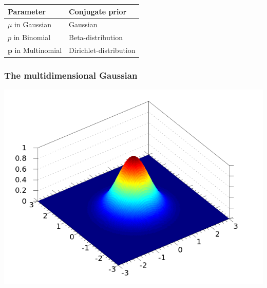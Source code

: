 \documentclass[12pt, a4paper]{article}
\newcommand{\vect}[1]{\bm{#1}}
\begin{document}
\begin{center}
	\begin{tabular}{ll} 
		\toprule 
		Parameter & Conjugate prior \\ \midrule
		$\mu$ in Gaussian & Gaussian \\
		$p$ in Binomial & Beta-distribution \\
		$\vect{p}$ in Multinomial & Dirichlet-distribution \\
		\bottomrule
	\end{tabular}
\end{center}


\subsubsection*{The multidimensional Gaussian}
\begin{center}
	\includegraphics[width=0.6\linewidth]{figs/2d_gaussian}
\end{center}
\end{document}
